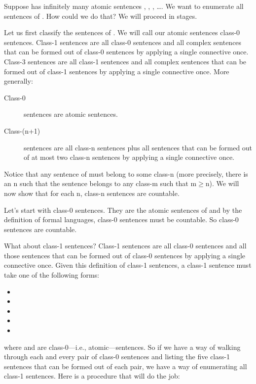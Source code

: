 Suppose \lL[] has infinitely many atomic sentences , , , 
\ldots.  We want to enumerate all sentences of \lL{}. How could we do that? We 
will proceed in stages.

Let us first classify the sentences of \lL{}. We will call our atomic sentences 
class-0 sentences. Class-1 sentences are all class-0 sentences and all complex 
sentences that can be formed out of class-0 sentences by applying a single 
connective once. Class-3 sentences are all class-1 sentences and all complex 
sentences that can be formed out of class-1 sentences by applying a single 
connective once.  More generally:
\begin{description}
 \item[Class-0] sentences are atomic sentences.
 \item[Class-(n+1)] sentences are all class-n sentences plus all sentences that 
  can be formed out of at most two class-n sentences by applying a single 
  connective once.
\end{description}

Notice that any sentence of \lL{} must belong to some class-n (more precisely, 
there is an n such that the sentence belongs to any class-m such that m$\geq$n).
We will now show that for each n, class-n sentences are countable. 

Let's start with class-0 sentences. They are the atomic sentences of \lL{} and 
by the definition of formal languages, class-0 sentences must be countable. So 
class-0 sentences are countable.

What about class-1 sentences? Class-1 sentences are all class-0 sentences and 
all those sentences that can be formed out of class-0 sentences by applying a 
single connective once. Given this definition of class-1 sentences,  a class-1 
sentence must take one of the following forms:
\begin{itemize}
 \item {}
 \item {}
 \item {}
  \item {}
 \item {}
\end{itemize}
where  and  are class-0---i.e., atomic---sentences. So if we have a 
way of walking through each and every pair of class-0 sentences and listing the 
five class-1 sentences that can be formed out of each pair, we have a way of 
enumerating all class-1 sentences. Here is a procedure that will do the job:

